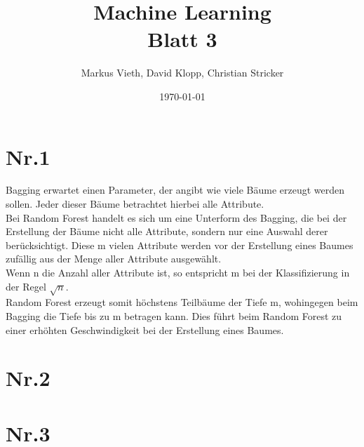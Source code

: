 \documentclass[a4paper,11pt,twoside]{article}
\title{Machine Learning\\ Blatt 3}
\author{Markus Vieth, David Klopp, Christian Stricker}
\date{\today}
\begin{document}
\newcommand{\cor}[1]{\textcolor{red}{\textit{#1}}}
\maketitle
\cleardoublepage
\pagestyle{myheadings}

\section*{Nr.1}
Bagging erwartet einen Parameter, der angibt wie viele Bäume erzeugt werden sollen. Jeder dieser Bäume betrachtet hierbei alle Attribute. \\
Bei Random Forest handelt es sich um eine Unterform des Bagging, die bei der Erstellung der Bäume nicht alle Attribute, sondern nur eine Auswahl derer berücksichtigt. Diese m vielen Attribute werden vor der Erstellung eines Baumes zufällig aus der Menge aller Attribute ausgewählt. \\Wenn n die Anzahl aller Attribute ist, so entspricht m bei der Klassifizierung in der Regel $\sqrt n$.\\
Random Forest erzeugt somit höchstens Teilbäume der Tiefe m, wohingegen beim Bagging die Tiefe bis zu m betragen kann. 
Dies führt beim Random Forest zu einer erhöhten Geschwindigkeit bei der Erstellung eines Baumes.
\section*{Nr.2}

\section*{Nr.3}
\end{document}
